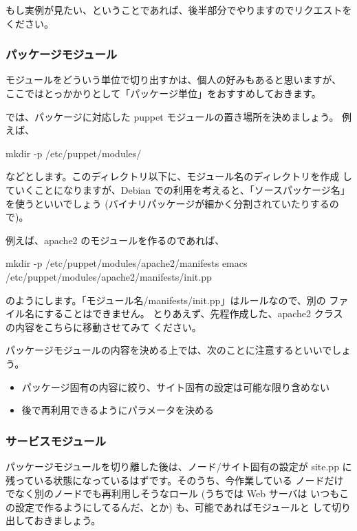 \documentclass[mingoth,a4paper]{jsarticle}
\begin{document}
もし実例が見たい、ということであれば、後半部分でやりますのでリクエストを
ください。

\subsubsection{パッケージモジュール}

モジュールをどういう単位で切り出すかは、個人の好みもあると思いますが、
ここではとっかかりとして「パッケージ単位」をおすすめしておきます。

では、パッケージに対応した puppet モジュールの置き場所を決めましょう。
例えば、

\begin{commandline}
mkdir -p /etc/puppet/modules/
\end{commandline}

などとします。このディレクトリ以下に、モジュール名のディレクトリを作成
していくことになりますが、Debian での利用を考えると、「ソースパッケージ名」
を使うといいでしょう (バイナリパッケージが細かく分割されていたりするので)。

例えば、apache2 のモジュールを作るのであれば、

\begin{commandline}
mkdir -p /etc/puppet/modules/apache2/manifests
emacs /etc/puppet/modules/apache2/manifests/init.pp
\end{commandline}

のようにします。「モジュール名/manifests/init.pp」はルールなので、別の
ファイル名にすることはできません。
とりあえず、先程作成した、apache2 クラスの内容をこちらに移動させてみて
ください。

パッケージモジュールの内容を決める上では、次のことに注意するといいでしょう。
\begin{itemize}
\item
  パッケージ固有の内容に絞り、サイト固有の設定は可能な限り含めない
\item
  後で再利用できるようにパラメータを決める
\end{itemize}

\subsubsection{サービスモジュール}

パッケージモジュールを切り離した後は、ノード/サイト固有の設定が
site.pp に残っている状態になっているはずです。そのうち、今作業している
ノードだけでなく別のノードでも再利用しそうなロール (うちでは Web サーバは
いつもこの設定で作るようにしてるんだ、とか) も、可能であればモジュールと
して切り出しておきましょう。
\end{document}
